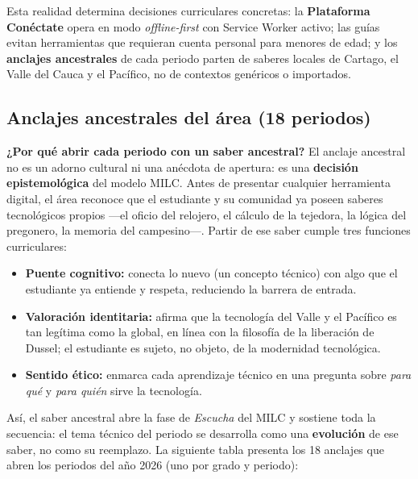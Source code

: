 \documentclass[12pt, a4paper]{article}
\begin{document}
Esta realidad determina decisiones curriculares concretas: la \textbf{Plataforma
Conéctate} opera en modo \textit{offline-first} con Service Worker activo; las
guías evitan herramientas que requieran cuenta personal para menores de edad;
y los \textbf{anclajes ancestrales} de cada periodo parten de saberes locales
de Cartago, el Valle del Cauca y el Pacífico, no de contextos genéricos o
importados.

\subsection{Anclajes ancestrales del área (18 periodos)}

\textbf{¿Por qué abrir cada periodo con un saber ancestral?} El anclaje
ancestral no es un adorno cultural ni una anécdota de apertura: es una
\textbf{decisión epistemológica} del modelo MILC. Antes de presentar cualquier
herramienta digital, el área reconoce que el estudiante y su comunidad ya poseen
saberes tecnológicos propios —el oficio del relojero, el cálculo de la tejedora,
la lógica del pregonero, la memoria del campesino—. Partir de ese saber cumple
tres funciones curriculares:

\begin{itemize}
  \item \textbf{Puente cognitivo:} conecta lo nuevo (un concepto técnico) con
    algo que el estudiante ya entiende y respeta, reduciendo la barrera de entrada.
  \item \textbf{Valoración identitaria:} afirma que la tecnología del Valle y el
    Pacífico es tan legítima como la global, en línea con la filosofía de la
    liberación de Dussel; el estudiante es sujeto, no objeto, de la modernidad
    tecnológica.
  \item \textbf{Sentido ético:} enmarca cada aprendizaje técnico en una pregunta
    sobre \textit{para qué} y \textit{para quién} sirve la tecnología.
\end{itemize}

Así, el saber ancestral abre la fase de \textit{Escucha} del MILC y sostiene toda
la secuencia: el tema técnico del periodo se desarrolla como una \textbf{evolución}
de ese saber, no como su reemplazo. La siguiente tabla presenta los 18 anclajes
que abren los periodos del año 2026 (uno por grado y periodo):
\end{document}
